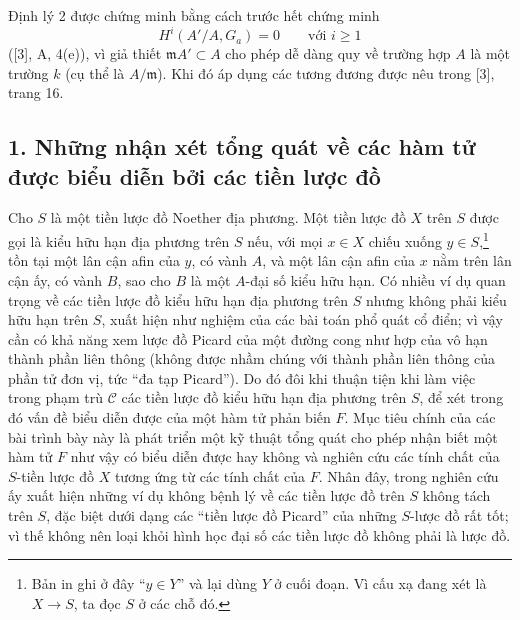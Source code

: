 Định lý 2 được chứng minh bằng cách trước hết chứng minh
\[
  H^i(A'/A,G_a)=0\qquad\text{với }i\geq 1
\]
([3], A, 4(e)), vì giả thiết $\mathfrak mA'\subset A$ cho phép dễ dàng quy về
trường hợp $A$ là một trường $k$ (cụ thể là $A/\mathfrak m$). Khi đó áp dụng
các tương đương được nêu trong [3], trang 16.


\subsection*{1. Những nhận xét tổng quát về các hàm tử được biểu diễn bởi các tiền lược đồ}

Cho $S$ là một tiền lược đồ Noether địa phương. Một tiền lược đồ $X$ trên
$S$ được gọi là kiểu hữu hạn địa phương trên $S$ nếu, với mọi
$x\in X$ chiếu xuống $y\in S$,\footnote{Bản in ghi ở đây ``$y\in Y$'' và lại
dùng $Y$ ở cuối đoạn. Vì cấu xạ đang xét là $X\longrightarrow S$, ta đọc $S$
ở các chỗ đó.} tồn tại một lân cận afin của $y$, có vành $A$, và một lân cận
afin của $x$ nằm trên lân cận ấy, có vành $B$, sao cho $B$ là một $A$-đại số
kiểu hữu hạn. Có nhiều ví dụ quan trọng về các tiền lược đồ kiểu hữu hạn địa
phương trên $S$ nhưng không phải kiểu hữu hạn trên $S$, xuất hiện như nghiệm
của các bài toán phổ quát cổ điển; vì vậy cần có khả năng xem lược đồ Picard
của một đường cong như hợp của vô hạn thành phần liên thông (không được nhầm
chúng với thành phần liên thông của phần tử đơn vị, tức ``đa tạp Picard'').
Do đó đôi khi thuận tiện khi làm việc trong phạm trù $\mathcal C$ các tiền
lược đồ kiểu hữu hạn địa phương trên $S$, để xét trong đó vấn đề biểu diễn
được của một hàm tử phản biến $F$. Mục tiêu chính của các bài trình bày này là
phát triển một kỹ thuật tổng quát cho phép nhận biết một hàm tử $F$ như vậy có
biểu diễn được hay không và nghiên cứu các tính chất của $S$-tiền lược đồ $X$
tương ứng từ các tính chất của $F$. Nhân đây, trong nghiên cứu ấy xuất hiện
những ví dụ không bệnh lý về các tiền lược đồ trên $S$ không tách trên $S$,
đặc biệt dưới dạng các ``tiền lược đồ Picard'' của những $S$-lược đồ rất tốt;
vì thế không nên loại khỏi hình học đại số các tiền lược đồ không phải là
lược đồ.

